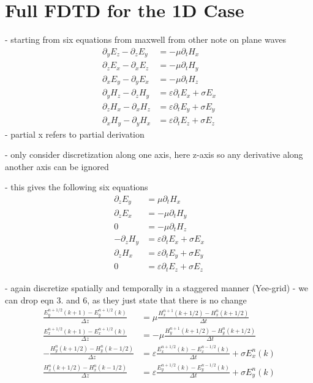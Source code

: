 \documentclass[]{report}
\begin{document}
\section{Full FDTD for the 1D Case}
- starting from six equations from maxwell from other note on plane waves
\begin{align}
	\partial_y E_z - \partial_z E_y &= -\mu \partial_t H_x \\
	\partial_z E_x - \partial_x E_z &= -\mu \partial_t H_y \\
	\partial_x E_y - \partial_y E_x &= -\mu \partial_t H_z \\
	\partial_y H_z - \partial_z H_y &= \varepsilon \partial_t E_x + \sigma E_x \\
	\partial_z H_x - \partial_x H_z &= \varepsilon \partial_t E_y + \sigma E_y \\
	\partial_x H_y - \partial_y H_x &= \varepsilon \partial_t E_z + \sigma E_z
\end{align}
- partial x refers to partial derivation

- only consider discretization along one axis, here z-axis so any derivative along another axis
can be ignored

- this gives the following six equations
\begin{align}
	\partial_z E_y &= \mu \partial_t H_x \\
	\partial_z E_x &= -\mu \partial_t H_y \\
	0 &= -\mu \partial_t H_z \\
	- \partial_z H_y &= \varepsilon \partial_t E_x + \sigma E_x \\
	\partial_z H_x  &= \varepsilon \partial_t E_y + \sigma E_y \\
	0 &= \varepsilon \partial_t E_z + \sigma E_z
\end{align}

- again discretize spatially and temporally in a staggered manner (Yee-grid)
- we can drop eqn 3. and 6, as they just state that there is no change
\begin{align}
	\frac{E_y^{n+1/2}(k+1)-E_y^{n+1/2}(k)}{\Delta z} &= \mu \frac{H_x^{n+1}(k+1/2)-H_x^{n}(k+1/2)}{\Delta t} \\
	\frac{E_x^{n+1/2}(k+1)-E_x^{n+1/2}(k)}{\Delta z} &= -\mu \frac{H_y^{n+1}(k+1/2)-H_y^{n}(k+1/2)}{\Delta t} \\
	-\frac{H_y^{n}(k+1/2)-H_y^{n}(k-1/2)}{\Delta z} &= \varepsilon \frac{E_x^{n+1/2}(k)-E_x^{n-1/2}(k)}{\Delta t} + \sigma E_x^n(k) \\
	\frac{H_x^{n}(k+1/2)-H_x^{n}(k-1/2)}{\Delta z} &= \varepsilon \frac{E_y^{n+1/2}(k)-E_y^{n-1/2}(k)}{\Delta t} + \sigma E_y^n(k)
\end{align}
\end{document}
